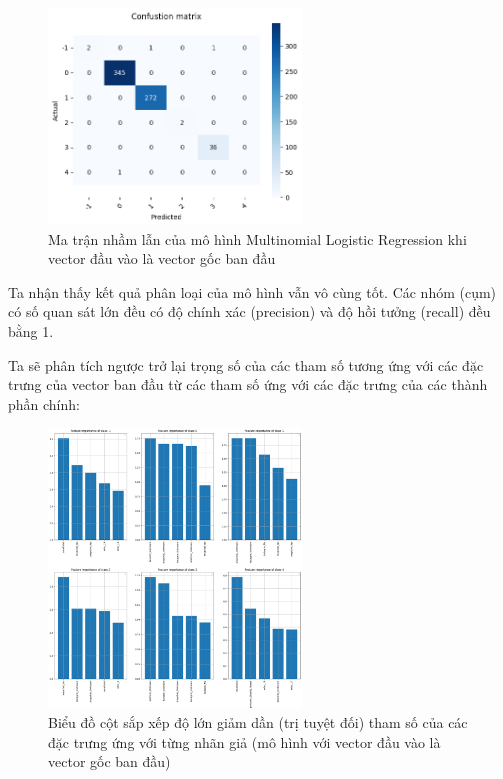 \begin{enumerate}[label=(\alph*)]
    \begin{figure}[H]
        \centering
        \includegraphics[width=0.6\textwidth]{figures/Thanh/Data_Analysis/Non_null_confusion_matrix_Logistic_original_features.png}
        \caption{Ma trận nhầm lẫn của mô hình Multinomial Logistic Regression khi vector đầu vào là vector gốc ban đầu}
        \label{fig:Non_null_confusion_matrix_Logistic_original_features}
    \end{figure}

    Ta nhận thấy kết quả phân loại của mô hình vẫn vô cùng tốt.
    Các nhóm (cụm) có số quan sát lớn đều có độ chính xác (precision) và độ hồi tưởng (recall) đều bằng 1.

    Ta sẽ phân tích ngược trở lại trọng số của các tham số tương ứng với các đặc trưng của vector ban đầu từ các tham số ứng với các đặc trưng của các thành phần chính:

    \begin{figure}[H]
        \centering
        \includegraphics[width=0.6\textwidth]{figures/Thanh/Data_Analysis/Non_null_Feature_Importance_Logistic_original_features.png}
        \caption{Biểu đồ cột sắp xếp độ lớn giảm dần (trị tuyệt đối) tham số của các đặc trưng ứng với từng nhãn giả (mô hình với vector đầu vào là vector gốc ban đầu)}
        \label{fig:Non_null_Feature_Importance_Logistic_original_features}
    \end{figure}


\end{enumerate}
